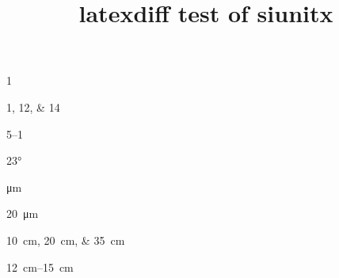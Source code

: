 \documentclass[a4paper,10pt]{letter}
\title{latexdiff test of siunitx}
\begin{document}
\num{1}

\numlist{1;12;14}


\numrange{5}{1}

\ang{23}

\unit{\um}

\qty{20}{\um}

\qtylist{10;20;35}{\cm}


\qtyrange{12}{15}{\cm}


\end{document}
